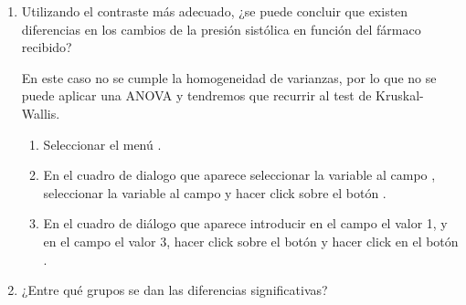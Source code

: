 \begin{description}
\begin{enumerate}[leftmargin=*]
\begin{enumerate}
\item Utilizando el contraste más adecuado, ¿se puede concluir que existen diferencias en los cambios de la presión sistólica en función del fármaco recibido?
\begin{indicacion}
En este caso no se cumple la homogeneidad de varianzas, por lo que no se puede aplicar una ANOVA y tendremos que recurrir al test de Kruskal-Wallis.
\begin{enumerate}
\item  Seleccionar el menú .
\item En el cuadro de dialogo que aparece seleccionar la variable
  al campo , seleccionar la
 variable  al campo  y hacer click sobre el botón .
\item En el cuadro de diálogo que aparece introducir en el campo  el valor 1, y en el campo  el valor 3, hacer click sobre el botón  y hacer click en el botón .
\end{enumerate}
\end{indicacion}

\item ¿Entre qué grupos se dan las diferencias significativas?


\end{enumerate}
\end{enumerate}
\end{description}
